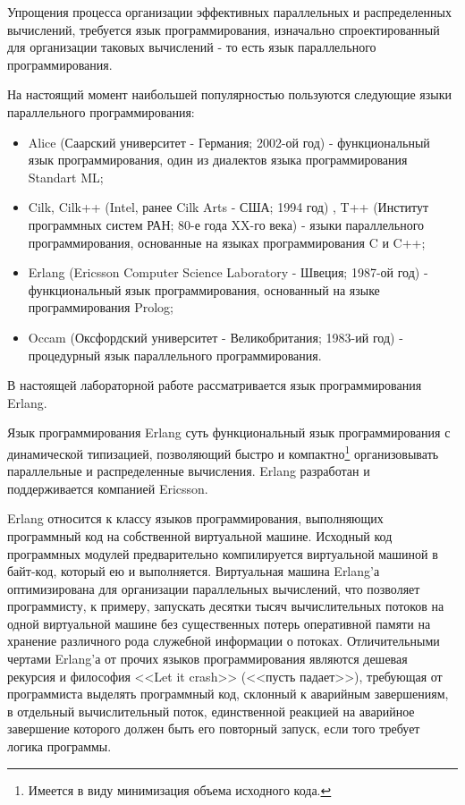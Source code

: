 

Упрощения процесса организации эффективных параллельных и распределенных вычислений, требуется язык программирования, изначально спроектированный для организации таковых вычислений - то есть язык параллельного программирования.

На настоящий момент наибольшей популярностью пользуются следующие языки параллельного программирования:

\begin{itemize}

	\item Alice (Саарский университет - Германия; 2002-ой год) - функциональный язык программирования, один из диалектов языка программирования Standart ML;
	\item Cilk, Cilk++ (Intel, ранее Cilk Arts - США; 1994 год) , T++ (Институт программных систем РАН; 80-е года XX-го века) - языки параллельного программирования, основанные на языках программирования C и C++;
	\item Erlang (Ericsson Computer Science Laboratory - Швеция; 1987-ой год) - функциональный язык программирования, основанный на языке программирования Prolog;
	\item Occam (Оксфордский университет - Великобритания; 1983-ий год) - процедурный язык параллельного программирования.

\end{itemize}

В настоящей лабораторной работе рассматривается язык программирования Erlang.


Язык программирования Erlang \cite{erlang} суть функциональный язык программирования с динамической типизацией, позволяющий быстро и компактно\footnote{Имеется в виду минимизация объема исходного кода.} организовывать параллельные и распределенные вычисления. Erlang разработан и поддерживается компанией \linebreak Ericsson.

Erlang относится к классу языков программирования, выполняющих программный код на собственной виртуальной машине. Исходный код программных модулей предварительно компилируется виртуальной машиной в байт-код, который ею и выполняется. Виртуальная машина Erlang'а оптимизирована для организации параллельных вычислений, что позволяет программисту, к примеру, запускать десятки тысяч вычислительных потоков на одной виртуальной машине без существенных потерь оперативной памяти на хранение различного рода служебной информации о потоках. Отличительными чертами Erlang'а от прочих языков программирования являются дешевая рекурсия и философия <<Let it crash>> (<<пусть падает>>), требующая от программиста выделять программный код, склонный к аварийным завершениям, в отдельный вычислительный поток, единственной реакцией на аварийное завершение которого должен быть его повторный запуск, если того требует логика программы.

